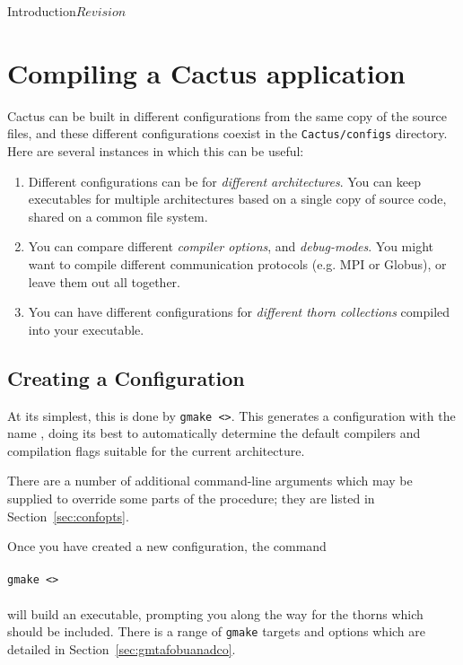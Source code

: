 \begin{cactuspart}{Introduction}{}{$Revision$}
\section{Compiling a Cactus application}



Cactus can be built in different configurations from the same copy of
the source files, and these different configurations coexist in the
\texttt{Cactus/configs} directory. Here are several instances in which
 this can be useful:

\begin{enumerate}
\item{}Different configurations can be for \emph{different
architectures}. You can keep executables for multiple architectures
based on a single copy of source code, shared on a common file
system.
\item{} You can compare different \textit{compiler options}, and \textit{debug-modes}.
  You might want to compile different communication protocols
  (e.g. MPI or Globus), or leave them out all together.
\item{} You can have different configurations for \textit{different thorn
    collections} compiled into your executable.
\end{enumerate}

\subsection{Creating a Configuration}
\label{sec:configurations}

At its simplest, this is done by \texttt{gmake <>}.
This generates a
configuration with the name \texttt{}, doing its best to
automatically determine the default compilers and compilation flags
suitable for the current architecture.

There are a number of additional command-line arguments which may be supplied
to override some parts of the procedure; they are listed in Section~\ref{sec:confopts}.

Once you have created a new configuration, the command
\\ \\
\texttt{gmake <>}
\\ \\
will build an executable, prompting you along the way for the
thorns which should be included. There is a range of \texttt{gmake}
targets and options which are detailed in Section~\ref{sec:gmtafobuanadco}.


\end{cactuspart}
